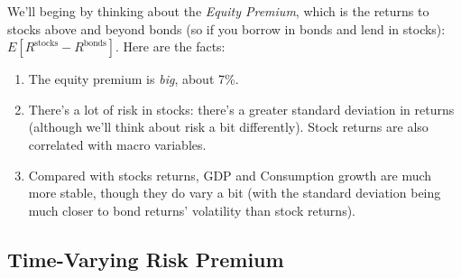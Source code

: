 \documentclass[12pt]{article}
\theoremstyle{plain}
\theoremstyle{definition}
\theoremstyle{remark}
\begin{document}
We'll beging by thinking about the \emph{Equity Premium}, which
is the returns to stocks above and beyond bonds (so if you borrow
in bonds and lend in stocks): $E[R^{\text{stocks}}-R^{\text{bonds}}]$.
Here are the facts:
\begin{enumerate}
    \item The equity premium is \emph{big}, about 7\%.
    \item There's a lot of risk in stocks: there's a greater
	standard deviation in returns (although we'll think about
	risk a bit differently). Stock returns are also correlated
	with macro variables.
    \item Compared with stocks returns, GDP and Consumption growth are much
	more stable, though they do vary a bit (with the standard deviation
	being much closer to bond returns' volatility than stock returns).
\end{enumerate}

\subsection{Time-Varying Risk Premium}
\end{document}
